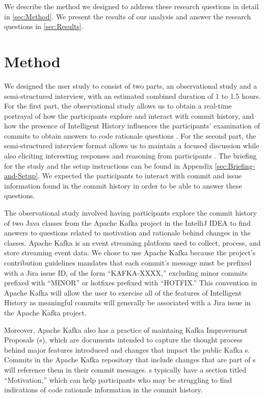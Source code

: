 We describe the method we designed to address these research questions in detail in \autoref{sec:Method}.
We present the results of our analysis and answer the research questions in \autoref{sec:Results}.

\section{Method}
\label{sec:Method}

We designed the user study to consist of two parts,
an observational study and a semi-structured interview, 
with an estimated combined duration of 1 to 1.5 hours.
For the first part, the observational study allows us to obtain a real-time 
portrayal of how the participants explore and interact with commit history,
and how the presence of Intelligent History influences the participants'
examination of commits to obtain answers to code rationale questions \cite{shull_guide_2007}.
For the second part, the semi-structured interview format allows us to maintain a focused discussion 
while also eliciting interesting responses and reasoning from participants \cite{shull_guide_2007}.
The briefing for the study and the setup instructions can be found in Appendix \ref{sec:Briefing-and-Setup}.
We expected the participants to interact with commit and issue information 
found in the commit history in order to be able to answer these questions.

The observational study involved having participants explore the commit history of two Java classes 
from the Apache Kafka project in the IntelliJ IDEA  
to find answers to questions related to motivation and rationale behind changes in the classes.
Apache Kafka is an event streaming platform used to collect, process, and store streaming event data.
We chose to use Apache Kafka because the project's contribution guidelines mandates that
each commit's message must be prefixed with a Jira issue ID, of the form ``KAFKA-XXXX,''
excluding minor commits prefixed with ``MINOR'' or hotfixes prefixed with ``HOTFIX.''
This convention in Apache Kafka will allow the user to exercise all of the features of Intelligent History
as meaningful commits will generally be associated with a Jira issue in the Apache Kafka project.

Moreover, Apache Kafka also has a practice of maintaing Kafka Improvement Proposals (s),
which are documents intended to capture the thought process behind major features introduced 
and changes that impact the public Kafka s.
Commits in the Apache Kafka repository that include changes that are part of s will
reference them in their commit messages.
s typically have a section titled ``Motivation,''
which can help participants who may be struggling to find indications of code rationale information
in the commit history.

